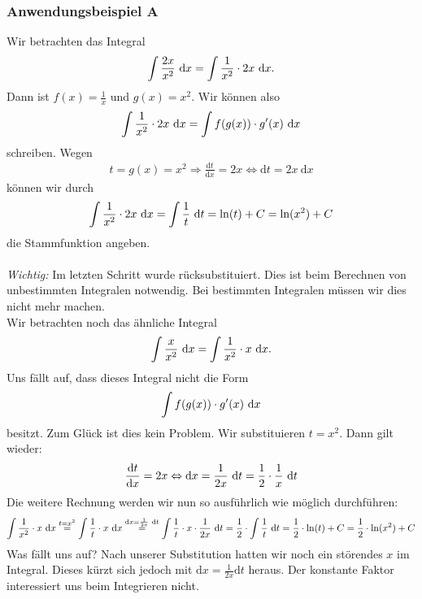 \subsubsection*{Anwendungsbeispiel A}
Wir betrachten das Integral
\begin{align*}
\int \frac{2 x}{x^2} \ \text{\rmfamily d} x
= 
\int \frac{1}{x^2} \cdot  2x \ \text{\rmfamily d} x.
\end{align*}
Dann ist $f(x) = \frac{1}{x}$ und $g(x)=x^2$.
Wir können also 
\begin{align*}
\int \frac{1}{x^2} \cdot  2x \ \text{\rmfamily d} x 
= 
\int f(g(x)) \cdot g^\prime(x)  \ \text{\rmfamily d} x
\end{align*}
schreiben.
Wegen
\begin{align*}
t = g(x) = x^2 
\Rightarrow
\frac{\mathrm{d} t }{\mathrm{d} x}
= 
2 x 
\Leftrightarrow
\mathrm{d} t = 2x \ \mathrm{d} x
\end{align*}
können wir durch
\begin{align*}
\int \frac{1}{x^2} \cdot  2x \ \text{\rmfamily d} x  = \int \frac{1}{t}  \ \text{\rmfamily d} t  = \ln(t) +C =\ln(x^2) + C
\end{align*}
die Stammfunktion angeben.\\ \\
\textit{Wichtig:} Im letzten Schritt wurde rücksubstituiert.
Dies ist beim Berechnen von unbestimmten Integralen notwendig.
Bei bestimmten Integralen müssen wir dies nicht mehr machen.\\
Wir betrachten noch das ähnliche Integral
\begin{align*}
\int \frac{x}{x^2} \ \text{\rmfamily d} x = \int \frac{1}{x^2} \cdot x \ \text{\rmfamily d} x.
\end{align*}
Uns fällt auf, dass dieses Integral nicht die Form
\begin{align*}
\int f(g(x)) \cdot g^\prime(x)  \ \text{\rmfamily d} x
\end{align*}
besitzt.
Zum Glück ist dies kein Problem.
Wir substituieren $t = x^2$.
Dann gilt wieder:
\begin{align*}
\frac{\mathrm{d} t }{\mathrm{d} x} = 2x 
\Leftrightarrow
\mathrm{d } x = \frac{1}{2 x} \ \text{\rmfamily d} t = \frac{1}{2} \cdot \frac{1}{x} \ \text{\rmfamily d} t
\end{align*}
Die weitere Rechnung werden wir nun so ausführlich wie möglich durchführen:
\begin{align*}
\int \frac{1}{x^2} \cdot x \ \text{\rmfamily d} x
\stackrel{t = x^2}{=}
\int \frac{1}{t} \cdot x \ \text{\rmfamily d} x
\stackrel{\mathrm{d } x = \frac{1}{2 x} \ \text{\rmfamily d} t}{=}
\int \frac{1}{t} \cdot x \cdot \frac{1}{2x} \ \text{\rmfamily d} t
= 
\frac{ 1}{2 } \cdot \int   \frac{1}{t} \ \text{\rmfamily d} t
= 
\frac{1}{2} \cdot \ln(t) + C 
= 
\frac{1}{2} \cdot \ln(x^2) + C
\end{align*}
Was fällt uns auf?
Nach unserer Substitution hatten wir noch ein störendes $x$ im Integral.
Dieses kürzt sich jedoch mit $\mathrm{d} x = \frac{1}{2x} \mathrm{d}t$ heraus.
Der konstante Faktor interessiert uns beim Integrieren nicht. 
\newpage
